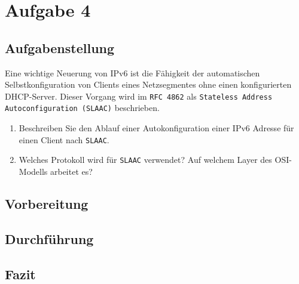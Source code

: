 \newpage

\section{Aufgabe 4}

\subsection{Aufgabenstellung}
Eine wichtige Neuerung von IPv6 ist die Fähigkeit der automatischen Selbstkonfiguration von Clients eines Netzsegmentes ohne einen konfigurierten DHCP-Server. Dieser Vorgang wird im \texttt{RFC 4862} als \texttt{Stateless Address Autoconfiguration (SLAAC)} beschrieben.

\begin{enumerate}[label=(\alph*)]
	\item Beschreiben Sie den Ablauf einer Autokonfiguration einer IPv6 Adresse für einen Client nach \texttt{SLAAC}.
	\item Welches Protokoll wird für \texttt{SLAAC} verwendet? Auf welchem Layer des OSI-Modells arbeitet es?
\end{enumerate}

\subsection{Vorbereitung}

\subsection{Durchführung}

\subsection{Fazit}